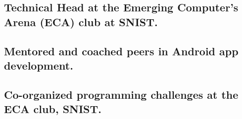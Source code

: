 \documentclass[a4,10pt]{article}
\begin{document}
\subsection*{Technical Head {\normalsize \normalfont at the Emerging Computer’s Arena (ECA) club at SNIST.}} 
\vspace{0.1cm}
\subsection*{Mentored and coached {\normalsize \normalfont peers in Android app development.}} 
\vspace{0.1cm}
\subsection*{Co-organized {\normalsize \normalfont programming challenges at the ECA club, SNIST.}} 



\end{document}
